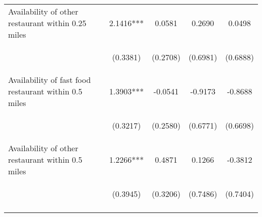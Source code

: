 \documentclass[]{article}
\begin{document}
\begin{center}
\begin{tabular}{lcccc}
Availability of other restaurant within 0.25 miles & 2.1416*** & 0.0581 & 0.2690 & 0.0498 \\
\vspace{4pt} & \begin{footnotesize}(0.3381)\end{footnotesize} & \begin{footnotesize}(0.2708)\end{footnotesize} & \begin{footnotesize}(0.6981)\end{footnotesize} & \begin{footnotesize}(0.6888)\end{footnotesize} \\
Availability of fast food restaurant within 0.5 miles & 1.3903*** & -0.0541 & -0.9173 & -0.8688 \\
\vspace{4pt} & \begin{footnotesize}(0.3217)\end{footnotesize} & \begin{footnotesize}(0.2580)\end{footnotesize} & \begin{footnotesize}(0.6771)\end{footnotesize} & \begin{footnotesize}(0.6698)\end{footnotesize} \\
Availability of other restaurant within 0.5 miles & 1.2266*** & 0.4871 & 0.1266 & -0.3812 \\
 & \begin{footnotesize}(0.3945)\end{footnotesize} & \begin{footnotesize}(0.3206)\end{footnotesize} & \begin{footnotesize}(0.7486)\end{footnotesize} & \begin{footnotesize}(0.7404)\end{footnotesize} \\
\vspace{4pt} & \begin{footnotesize}\end{footnotesize} & \begin{footnotesize}\end{footnotesize} & \begin{footnotesize}\end{footnotesize} & \begin{footnotesize}\end{footnotesize} \\

\end{tabular}
\end{center}
\end{document}
